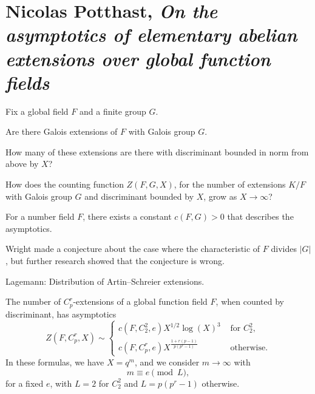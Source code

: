 \documentclass[reqno]{amsart} 
\begin{document}
\section{Nicolas Potthast, \emph{On the asymptotics of elementary abelian extensions over global function fields}}
Fix a global field $F$ and a finite group $G$.
\begin{question}
Are there Galois extensions of $F$ with Galois group $G$.
\end{question}
\begin{question}
How many of these extensions are there with discriminant bounded in norm from above by $X$?
\end{question}
\begin{question}
  How does the counting function $Z (F, G, X)$, for the number of extensions  $K/F$ with Galois group $G$ and discriminant bounded by $X$, grow as $X \rightarrow \infty$?
\end{question}
\begin{conjecture}[Malle 2005]
  For a number field $F$, there exists a constant $c (F, G) > 0$ that describes the asymptotics.
\end{conjecture}
Wright made a conjecture about the case where the characteristic of $F$ divides $\lvert G \rvert$, but further research showed that the conjecture is wrong.

Lagemann: Distribution of Artin--Schreier extensions.

\begin{theorem}
  The number of $C_p^r$-extensions of a global function field $F$, when counted by discriminant, has asymptotics
  \begin{equation*}
Z (F, C_p^r , X) \sim
\begin{cases}
c (F, C_2^2, e) X^{1/2} \log (X)^3  & \text{ for } C_2^2 , \\
c (F, C_p^r , e) X^{\frac{1 + r (p - 1 )}{p (p^r - 1 )}} & \text{ otherwise.}
\end{cases}
\end{equation*}
In these formulas, we have $X = q^m $, and we consider $m \rightarrow \infty $ with
\begin{equation*}
  m \equiv e \pmod{L},
\end{equation*}
for a fixed $e$, with $L = 2$ for $C_2^2 $ and $L = p (p^r-1)$ otherwise.
\end{theorem}



{} 
\end{document}

